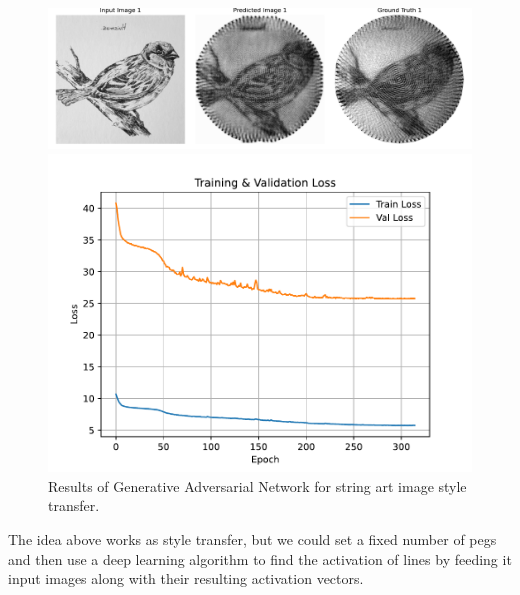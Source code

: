 \begin{figure}[H]
    \centering
    \begin{minipage}{0.7\linewidth}
        \centering
        \includegraphics[width=\linewidth]{images/AI/predictions.pdf}
    \end{minipage}%
    \hfill
    \begin{minipage}{0.3\linewidth}
        \centering
        \includegraphics[width=\linewidth]{images/AI/loss.pdf}
    \end{minipage}
    \caption{Results of Generative Adversarial Network for string art image style transfer.}
    \label{fig:ai}
\end{figure}

The idea above works as style transfer, but we could set a fixed number of pegs and then use a deep learning algorithm to find the activation of lines by feeding it input images along with their resulting activation vectors.